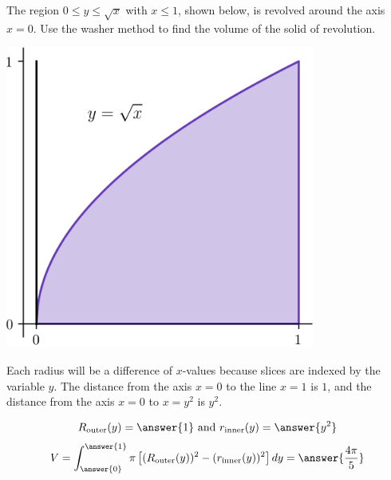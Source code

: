 \documentclass{ximera}
\begin{document}
\begin{problem}
The region $0 \leq y \leq \sqrt{x}$ with $x \leq 1$, shown below, is revolved around the axis $x=0$. Use the washer method to find the volume of the solid of revolution.
\begin{center}
\begin{image}
\includegraphics[width=4in]{diskwasher/disk04.png}
\end{image}
\end{center}
\begin{hint}
Each radius will be a difference of $x$-values because slices are indexed by the variable $y$.
The distance from the axis $x=0$ to the line $x=1$ is $1$, and the distance from the axis $x=0$ to $x = y^2$ is $y^2$.
\end{hint}
\begin{prompt}
\[ R_{\mathrm{outer}} (y) = \answer{1} \text{ and } r_{\mathrm{inner}}(y) = \answer{y^2} \]
\[ V = \int_{\answer{0}}^{\answer{1}} \pi  \left[ (R_{\mathrm{outer}}(y))^2 - (r_{\mathrm{inner}}(y))^2 \right] dy =  \answer{\frac{4\pi}{5}} \]
\end{prompt}

\end{problem}
\end{document}
